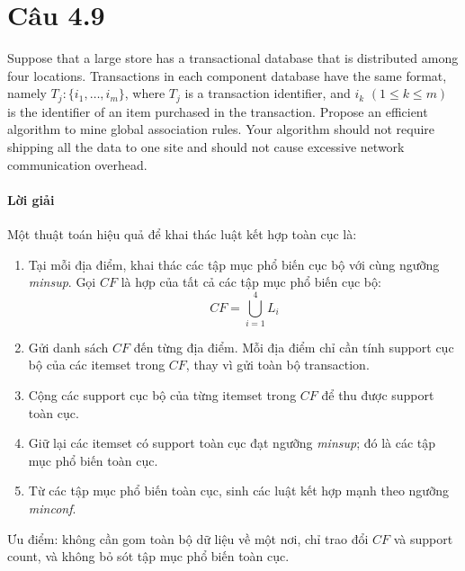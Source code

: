 \section{Câu 4.9}
Suppose that a large store has a transactional database that is distributed among four locations. Transactions in each component database have the same format, namely $T_j : \{i_1,\ldots,i_m\}$, where $T_j$ is a transaction identifier, and $i_k$ $(1 \leq k \leq m)$ is the identifier of an item purchased in the transaction. Propose an efficient algorithm to mine global association rules. Your algorithm should not require shipping all the data to one site and should not cause excessive network communication overhead.

\paragraph{Lời giải}
Một thuật toán hiệu quả để khai thác luật kết hợp toàn cục là:

\begin{enumerate}
    \item Tại mỗi địa điểm, khai thác các tập mục phổ biến cục bộ với cùng ngưỡng \textit{minsup}. Gọi $CF$ là hợp của tất cả các tập mục phổ biến cục bộ:
          \[
              CF = \bigcup_{i=1}^{4} L_i
          \]
    \item Gửi danh sách $CF$ đến từng địa điểm. Mỗi địa điểm chỉ cần tính support cục bộ của các itemset trong $CF$, thay vì gửi toàn bộ transaction.
    \item Cộng các support cục bộ của từng itemset trong $CF$ để thu được support toàn cục.
    \item Giữ lại các itemset có support toàn cục đạt ngưỡng \textit{minsup}; đó là các tập mục phổ biến toàn cục.
    \item Từ các tập mục phổ biến toàn cục, sinh các luật kết hợp mạnh theo ngưỡng \textit{minconf}.
\end{enumerate}

Ưu điểm: không cần gom toàn bộ dữ liệu về một nơi, chỉ trao đổi $CF$ và support count, và không bỏ sót tập mục phổ biến toàn cục.

